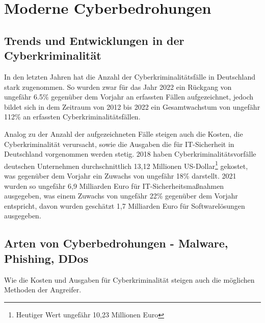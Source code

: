 \newpage


\section{Moderne Cyberbedrohungen}\label{sec:moderne-cyberbedrohungen}

\subsection{Trends und Entwicklungen in der Cyberkriminalität}\label{subsec:trends-und-entwicklungen-in-der-cyberkriminalitat}
In den letzten Jahren hat die Anzahl der Cyberkriminalitätsfälle in Deutschland stark zugenommen.
So wurden zwar für das Jahr 2022 ein Rückgang von ungefähr 6.5\% gegenüber dem Vorjahr an erfassten Fällen aufgezeichnet, jedoch bildet sich in dem Zeitraum von 2012 bis 2022 ein Gesamtwachstum von ungefähr 112\% an erfassten Cyberkriminalitätsfällen\autocite[\vglf][]{bka-cyberkriminalitaet}.

Analog zu der Anzahl der aufgezeichneten Fälle steigen auch die Kosten, die Cyberkriminalität verursacht, sowie die Ausgaben die für IT-Sicherheit in Deutschland vorgenommen werden stetig.
2018 haben Cyberkriminalitätsvorfälle deutschen Unternehmen durchschnittlich 13,12 Millionen US-Dollar\footnote{Heutiger Wert ungefähr 10,23 Millionen Euro} gekostet, was gegenüber dem Vorjahr ein Zuwachs von ungefähr 18\% darstellt\autocite[\vglf][]{accenture-cyberkrime-kosten}.
2021 wurden so ungefähr 6,9 Milliarden Euro für IT-Sicherheitsmaßnahmen ausgegeben, was einem Zuwachs von ungefähr 22\% gegenüber dem Vorjahr entspricht\autocite[\vglf][]{bitkom-itsicherheit}, davon wurden geschätzt 1,7 Milliarden Euro für Softwarelösungen ausgegeben\autocite[\vglf][]{bitkom-itsicherheit-segment}.

\subsection[Arten von Cyberbedrohungen]{Arten von Cyberbedrohungen - Malware, Phishing, DDos}\label{subsec:arten-von-cyberbedrohungen---malware-phishing-ddos}
Wie die Kosten und Ausgaben für Cyberkriminalität steigen auch die möglichen Methoden der Angreifer.

